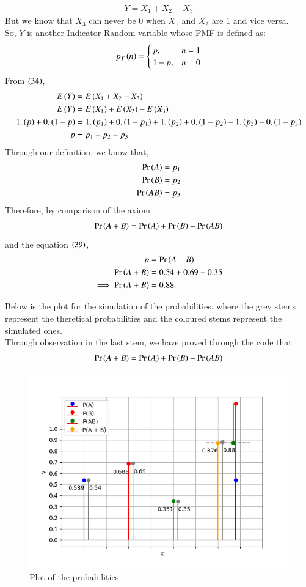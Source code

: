 \documentclass[journal]{IEEEtran}
\begin{document}
\begin{align}
	Y = X_1 + X_2 - X_3
\end{align}
But we know that $X_3$ can never be $0$ when $X_1$ and $X_2$ are $1$ and vice versa.\\
So, $Y$ is another Indicator Random variable whose PMF is defined as:
\begin{align}
	p_{Y}\left(n\right) =
	\begin{cases}
		p ,& n = 1\\
		1 - p ,& n = 0
	\end{cases}
\end{align}
From $\left(34\right)$,
\begin{align}
	E\left(Y\right) &= E\left(X_1 + X_2 - X_3\right)\\
	E\left(Y\right) &= E\left(X_1\right) + E\left(X_2\right) - E\left(X_3\right)\\
	1.\left(p\right) + 0.\left(1 - p\right) &= 1.\left(p_1\right) + 0.\left(1 - p_1\right) + 1.\left(p_2\right) + 0.\left(1 - p_2\right) - 1.\left(p_3\right) - 0.\left(1 - p_3\right)\\
	p &= p_1 + p_2 - p_3
\end{align}
Through our definition, we know that,
\begin{align}
	\Pr\left(A\right) = p_1\\
	\Pr\left(B\right) = p_2\\
	\Pr\left(AB\right) = p_3
\end{align}
Therefore, by comparison of the axiom
\begin{align}
	\Pr\left(A + B\right) = \Pr\left(A\right) + \Pr\left(B\right) - \Pr\left(AB\right)
\end{align}
and the equation $\left(39\right)$,
\begin{align}
	p &= \Pr\left(A + B\right)\\
	\Pr\left(A + B\right) &= 0.54 + 0.69 - 0.35\\
	\implies \Pr\left(A + B\right) &= 0.88
\end{align}

\pagebreak
Below is the plot for the simulation of the probabilities, where the grey stems represent the theretical probabilities and the coloured stems represent the simulated ones.\\
Through observation in the last stem, we have proved through the code that
\begin{align}
	\Pr\left(A + B\right) = \Pr\left(A\right) + \Pr\left(B\right) - \Pr\left(AB\right)
\end{align}

\begin{figure}[h!]
	\centering
	\includegraphics[width=1\columnwidth]{figs/simulated.png}
	\caption{Plot of the probabilities}
	\label{stemplot}
\end{figure}
\end{document}
